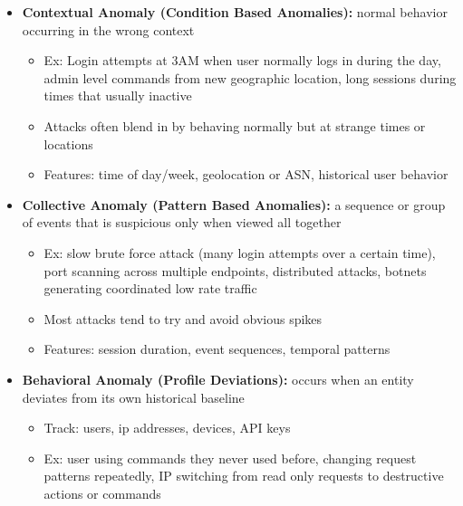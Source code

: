 \documentclass{article}
\begin{document}
\begin{itemize}
\begin{itemize}
\begin{itemize}
            \begin{itemize}
                \item Ex: Session with an unusually high number of commands, single IP making hundreds of requests per second, login attempt with extremely high password entropy
                \item Often indicates brute force attempts, bots, or probing
                \item Features: request count, command frequency, password entropy, sent/received bytes 
            \end{itemize}
            \item \textbf{Contextual Anomaly (Condition Based Anomalies):} normal behavior occurring in the wrong context 
            \begin{itemize}
                \item Ex: Login attempts at 3AM when user normally logs in during the day, admin level commands from new geographic location, long sessions during times that usually inactive 
                \item Attacks often blend  in by behaving normally but at strange times or locations 
                \item Features: time of day/week, geolocation or ASN, historical user behavior 
            \end{itemize}
            \item \textbf{Collective Anomaly (Pattern Based Anomalies):} a sequence or group of events that is suspicious only when viewed all together
            \begin{itemize}
                \item Ex: slow brute force attack (many login attempts over a certain time), port scanning across multiple endpoints, distributed attacks, botnets generating coordinated low rate traffic 
                \item Most attacks tend to try and avoid obvious spikes 
                \item Features: session duration, event sequences, temporal patterns 
            \end{itemize}
            \item \textbf{Behavioral Anomaly (Profile Deviations):} occurs when an entity deviates from its own historical baseline
            \begin{itemize}
                \item Track: users, ip addresses, devices, API keys
                \item Ex: user using commands they never used before, changing request patterns repeatedly, IP switching from read only requests to destructive actions or commands 

\end{itemize}
\end{itemize}
\end{itemize}
\end{itemize}
\end{document}
